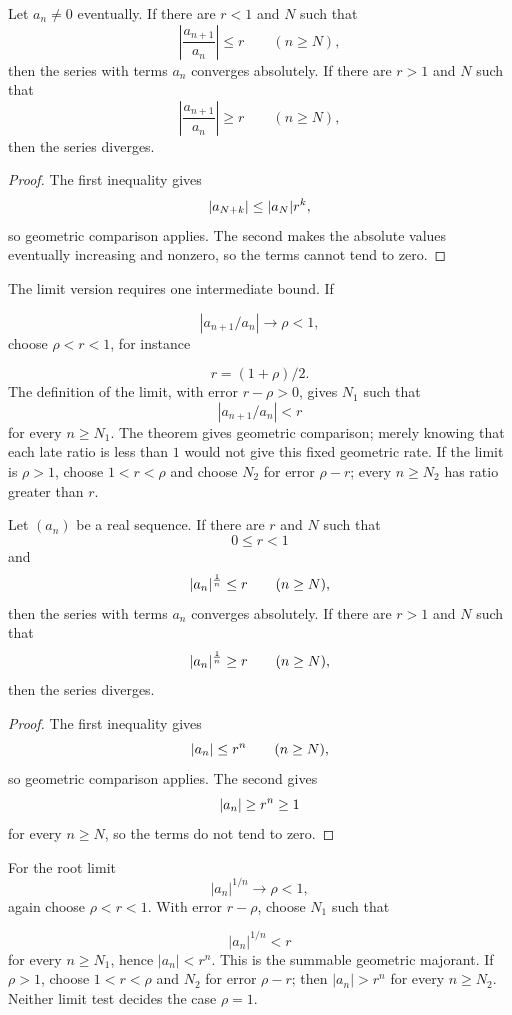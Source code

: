 \begin{theorem}
\label{thm:ratio-test}
Let $a_n\ne0$ eventually. If there are $r<1$ and $N$ such that
\[
\left|\frac{a_{n+1}}{a_n}\right|\leq r
\qquad(n\geq N),
\]
then the series with terms $a_n$ converges absolutely. If there are $r>1$ and $N$ such that
\[
\left|\frac{a_{n+1}}{a_n}\right|\geq r
\qquad(n\geq N),
\]
then the series diverges.
\end{theorem}
\begin{proof}
The first inequality gives
\[
\lvert a_{N+k}\rvert\leq\lvert a_N\rvert r^k,
\]
so geometric comparison applies. The second makes the absolute values eventually increasing and nonzero, so the terms cannot tend to zero.
\end{proof}

The limit version requires one intermediate bound. If

\[
|a_{n+1}/a_n|\to\rho<1,
\]
 choose $\rho<r<1$, for instance

\[
r=(1+\rho)/2.
\]
 The definition of the limit, with error $r-\rho>0$,
gives $N_1$ such that
\[
|a_{n+1}/a_n|<r
\]
 for every $n\geq N_1$. The theorem gives geometric
comparison; merely knowing that each late ratio is less than $1$ would
not give this fixed geometric rate. If the limit is $\rho>1$, choose
$1<r<\rho$ and choose $N_2$ for error $\rho-r$; every $n\geq N_2$ has ratio greater than $r$.

\begin{theorem}
\label{thm:root-test}
Let $(a_n)$ be a real sequence. If there are $r$ and $N$ such that
\[
0\leq r<1
\]
and
\[
\lvert a_n\rvert^{\frac1n}\leq r
\qquad(n\geq N),
\]
then the series with terms $a_n$ converges absolutely. If there are $r>1$ and $N$ such that
\[
\lvert a_n\rvert^{\frac1n}\geq r
\qquad(n\geq N),
\]
then the series diverges.
\end{theorem}
\begin{proof}
The first inequality gives
\[
\lvert a_n\rvert\leq r^n
\qquad(n\geq N),
\]
so geometric comparison applies. The second gives
\[
\lvert a_n\rvert\geq r^n\geq1
\]
for every $n\geq N$, so the terms do not tend to zero.
\end{proof}

For the root limit
\[
|a_n|^{1/n}\to\rho<1,
\]
 again choose
$\rho<r<1$. With error $r-\rho$, choose $N_1$ such that

\[
|a_n|^{1/n}<r
\]
 for every $n\geq N_1$, hence
$|a_n|<r^n$. This is the summable geometric majorant. If $\rho>1$,
choose $1<r<\rho$ and $N_2$ for error $\rho-r$; then
$|a_n|>r^n$ for every $n\geq N_2$. Neither limit
test decides the case $\rho=1$.

